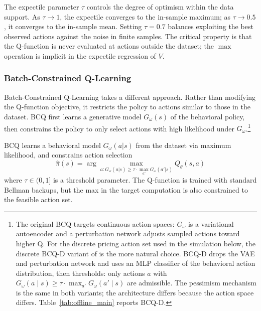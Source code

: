 The expectile parameter $\tau$ controls the degree of optimism within the data support. As $\tau \to 1$, the expectile converges to the in-sample maximum; as $\tau \to 0.5$, it converges to the in-sample mean. Setting $\tau = 0.7$ balances exploiting the best observed actions against the noise in finite samples. The critical property is that the Q-function is never evaluated at actions outside the dataset; the $\max$ operation is implicit in the expectile regression of $V$.

\subsubsection{Batch-Constrained Q-Learning}

Batch-Constrained Q-Learning \citep[BCQ,][]{Fujimoto2019} takes a different approach. Rather than modifying the Q-function objective, it restricts the policy to actions similar to those in the dataset. BCQ first learns a generative model $G_\omega(s)$ of the behavioral policy, then constrains the policy to only select actions with high likelihood under $G_\omega$.\footnote{The original \citet{Fujimoto2019} BCQ targets continuous action spaces: $G_\omega$ is a variational autoencoder and a perturbation network adjusts sampled actions toward higher Q. For the discrete pricing action set used in the simulation below, the discrete BCQ-D variant of \citet{Fujimoto2019b} is the more natural choice. BCQ-D drops the VAE and perturbation network and uses an MLP classifier of the behavioral action distribution, then thresholds: only actions $a$ with $G_\omega(a \mid s) \geq \tau \cdot \max_{a'} G_\omega(a' \mid s)$ are admissible. The pessimism mechanism is the same in both variants; the architecture differs because the action space differs. Table~\ref{tab:offline_main} reports BCQ-D.}

\begin{definition}
\label{def:bcq}
BCQ learns a behavioral model $G_\omega(a|s)$ from the dataset via maximum likelihood, and constrains action selection
\begin{equation}
\label{eq:bcq}
\hat{\pi}(s) = \arg\max_{a : G_\omega(a|s) \geq \tau \cdot \max_{a'} G_\omega(a'|s)} Q_\theta(s, a)
\end{equation}
where $\tau \in (0, 1]$ is a threshold parameter. The Q-function is trained with standard Bellman backups, but the max in the target computation is also constrained to the feasible action set.
\end{definition}

